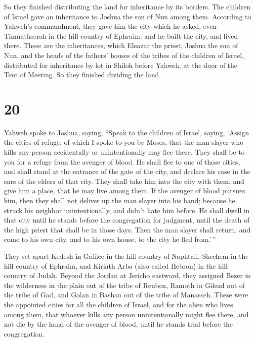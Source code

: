  So they finished distributing the land for inheritance by
its borders. The children of Israel gave an inheritance to Joshua the
son of Nun among them.  According to Yahweh's commandment,
they gave him the city which he asked, even Timnathserah in the hill
country of Ephraim; and he built the city, and lived there.
 These are the inheritances, which Eleazar the priest,
Joshua the son of Nun, and the heads of the fathers' houses of the
tribes of the children of Israel, distributed for inheritance by lot in
Shiloh before Yahweh, at the door of the Tent of Meeting. So they
finished dividing the land.

\hypertarget{section-19}{%
\section{20}\label{section-19}}

 Yahweh spoke to Joshua, saying,  ``Speak to the
children of Israel, saying, `Assign the cities of refuge, of which I
spoke to you by Moses,  that the man slayer who kills any
person accidentally or unintentionally may flee there. They shall be to
you for a refuge from the avenger of blood.  He shall flee
to one of those cities, and shall stand at the entrance of the gate of
the city, and declare his case in the ears of the elders of that city.
They shall take him into the city with them, and give him a place, that
he may live among them.  If the avenger of blood pursues
him, then they shall not deliver up the man slayer into his hand;
because he struck his neighbor unintentionally, and didn't hate him
before.  He shall dwell in that city until he stands before
the congregation for judgment, until the death of the high priest that
shall be in those days. Then the man slayer shall return, and come to
his own city, and to his own house, to the city he fled from.'\,''

 They set apart Kedesh in Galilee in the hill country of
Naphtali, Shechem in the hill country of Ephraim, and Kiriath Arba (also
called Hebron) in the hill country of Judah.  Beyond the
Jordan at Jericho eastward, they assigned Bezer in the wilderness in the
plain out of the tribe of Reuben, Ramoth in Gilead out of the tribe of
Gad, and Golan in Bashan out of the tribe of Manasseh. 
These were the appointed cities for all the children of Israel, and for
the alien who lives among them, that whoever kills any person
unintentionally might flee there, and not die by the hand of the avenger
of blood, until he stands trial before the congregation.

